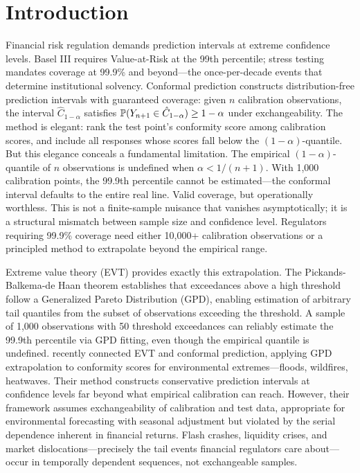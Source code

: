 
\section{Introduction}
\label{sec:introduction}

Financial risk regulation demands prediction intervals at extreme confidence levels. Basel III requires Value-at-Risk at the 99th percentile; stress testing mandates coverage at 99.9\% and beyond—the once-per-decade events that determine institutional solvency. Conformal prediction constructs distribution-free prediction intervals with guaranteed coverage: given $n$ calibration observations, the interval $\hat{C}_{1-\alpha}$ satisfies $\mathbb{P}(Y_{n+1} \in \hat{C}_{1-\alpha}) \geq 1-\alpha$ under exchangeability. The method is elegant: rank the test point's conformity score among calibration scores, and include all responses whose scores fall below the $(1-\alpha)$-quantile. But this elegance conceals a fundamental limitation. The empirical $(1-\alpha)$-quantile of $n$ observations is undefined when $\alpha < 1/(n+1)$. With 1{,}000 calibration points, the 99.9th percentile cannot be estimated—the conformal interval defaults to the entire real line. Valid coverage, but operationally worthless. This is not a finite-sample nuisance that vanishes asymptotically; it is a structural mismatch between sample size and confidence level. Regulators requiring 99.9\% coverage need either 10{,}000+ calibration observations or a principled method to extrapolate beyond the empirical range.

Extreme value theory (EVT) provides exactly this extrapolation. The Pickands-Balkema-de Haan theorem establishes that exceedances above a high threshold follow a Generalized Pareto Distribution (GPD), enabling estimation of arbitrary tail quantiles from the subset of observations exceeding the threshold. A sample of 1{,}000 observations with 50 threshold exceedances can reliably estimate the 99.9th percentile via GPD fitting, even though the empirical quantile is undefined. \citet{pasche2025extreme} recently connected EVT and conformal prediction, applying GPD extrapolation to conformity scores for environmental extremes—floods, wildfires, heatwaves. Their method constructs conservative prediction intervals at confidence levels far beyond what empirical calibration can reach. However, their framework assumes exchangeability of calibration and test data, appropriate for environmental forecasting with seasonal adjustment but violated by the serial dependence inherent in financial returns. Flash crashes, liquidity crises, and market dislocations—precisely the tail events financial regulators care about—occur in temporally dependent sequences, not exchangeable samples.

